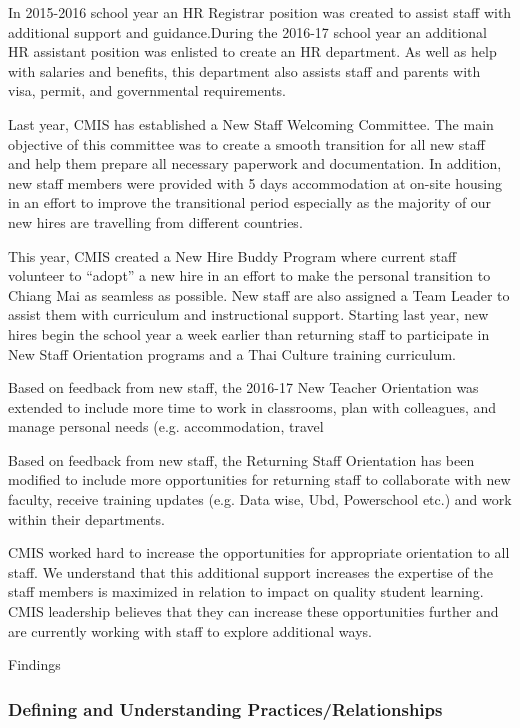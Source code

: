 \begin{findings}
In 2015-2016 school year an HR Registrar position was created to assist staff with additional support  and guidance.During the 2016-17 school year an additional HR assistant position was enlisted to create an HR department. As well as help with salaries and benefits, this department also assists staff and parents with visa, permit, and governmental requirements.

Last year, CMIS has established a New Staff Welcoming Committee. The main objective of this committee  was to create a smooth transition for all new staff and help them prepare all necessary paperwork and documentation. In addition, new staff members were provided with 5 days accommodation at on-site housing in an effort to improve the transitional period especially as the majority of our new hires are travelling from different countries.

This year, CMIS created a New Hire Buddy Program where current staff volunteer to “adopt” a new hire in an effort to make the personal transition to Chiang Mai as seamless as possible. New staff  are also assigned a Team Leader to assist them with curriculum and instructional support. Starting last year, new hires begin the school year a week earlier than returning staff to participate in New Staff Orientation programs and a Thai Culture training curriculum.

Based on feedback from new staff, the 2016-17 New Teacher Orientation was extended to include more time to work in classrooms, plan with colleagues, and manage personal needs (e.g. accommodation, travel

Based on feedback from new staff, the Returning Staff Orientation has been modified to include  more opportunities for returning staff to collaborate with new faculty, receive training updates (e.g. Data wise, Ubd, Powerschool etc.) and work within their departments.


CMIS worked hard to increase the opportunities for appropriate orientation to all staff. We understand that this additional support increases the expertise of the staff members is maximized in relation to impact on quality student learning. CMIS leadership believes that they can increase these opportunities further and are currently working with staff to explore additional ways.
\end{findings}Findings

\subsubsection{Defining and Understanding Practices/Relationships}

